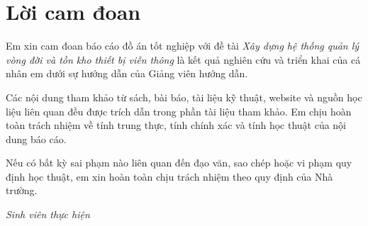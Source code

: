 \chapter*{Lời cam đoan}

Em xin cam đoan báo cáo đồ án tốt nghiệp với đề tài \textit{Xây dựng hệ thống quản lý vòng đời và tồn kho thiết bị viễn thông} là kết quả nghiên cứu và triển khai của cá nhân em dưới sự hướng dẫn của Giảng viên hướng dẫn.

Các nội dung tham khảo từ sách, bài báo, tài liệu kỹ thuật, website và nguồn học liệu liên quan đều được trích dẫn trong phần tài liệu tham khảo. Em chịu hoàn toàn trách nhiệm về tính trung thực, tính chính xác và tính học thuật của nội dung báo cáo.

Nếu có bất kỳ sai phạm nào liên quan đến đạo văn, sao chép hoặc vi phạm quy định học thuật, em xin hoàn toàn chịu trách nhiệm theo quy định của Nhà trường.

\begin{flushright}
\textit{Sinh viên thực hiện}\\
\dotfill
\end{flushright}

